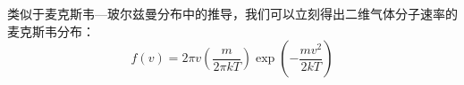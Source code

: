 

类似于麦克斯韦—玻尔兹曼分布中的推导，我们可以立刻得出二维气体分子速率的麦克斯韦分布：
\begin{equation}
f(v)=2\pi v\left(\frac{m}{2\pi kT}\right)\exp\left(-\frac{m v^2}{2kT}\right)
\end{equation}
